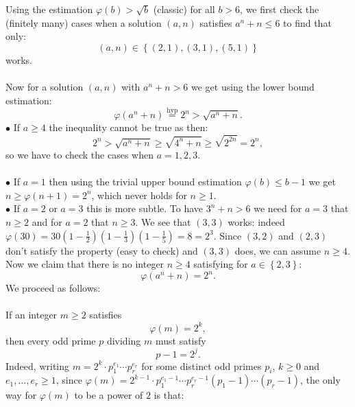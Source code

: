 \begin{solution}
    Using the estimation \( \varphi\left(b\right) > \sqrt{b} \) (classic) for all \( b > 6 \), we first check the (finitely many) cases when a solution \( \left(a,n\right) \) satisfies \( a^n + n \le 6 \) to find that only:
    \[
        \left(a,n\right) \in \left\{ \left(2,1\right), \left(3,1\right), \left(5,1\right) \right\}
    \]
    works.
    \\\\
    Now for a solution \( \left(a,n\right) \) with \( a^n + n > 6 \) we get using the lower bound estimation:
    \[
        \varphi \left( a^n + n \right) \overset{\text{hyp}}{=} 2^n > \sqrt{a^n + n}.
    \]
    \( \bullet \) If \( a \ge 4 \) the inequality cannot be true as then:
    \[
        2^n > \sqrt{a^n + n} \geq \sqrt{4^n + n} \geq \sqrt{2^{2n}} = 2^n,
    \]
    so we have to check the cases when \( a = 1, 2, 3 \).
    \\\\
    \( \bullet \) If \( a = 1 \) then using the trivial upper bound estimation \( \varphi\left(b\right) \leq b - 1 \) we get \( n \geq \varphi\left(n + 1\right) = 2^n \), which never holds for \( n \geq 1 \). \\
    \( \bullet \) If \( a = 2 \) or \( a = 3 \) this is more subtle. To have \( 3^n + n > 6 \) we need for \( a = 3 \) that \( n \geq 2 \) and for \( a = 2 \) that \( n \geq 3 \). We see that \( \left(3,3\right) \) works: indeed \( \varphi\left(30\right) = 30 \left(1 - \frac{1}{2}\right) \left(1 - \frac{1}{3}\right) \left(1 - \frac{1}{5}\right) = 8 = 2^3 \). Since \( \left(3,2\right) \) and \( \left(2,3\right) \) don't satisfy the property (easy to check) and \( \left(3,3\right) \) does, we can assume \( n \geq 4 \). Now we claim that there is no integer \( n \geq 4 \) satisfying for \( a \in \left\{2,3\right\} \):
    \[
        \varphi \left( a^n + n \right) = 2^n.
    \]
    We proceed as follows:
    \\\\
    If an integer \( m \geq 2 \) satisfies
    \[
        \varphi\left(m\right) = 2^k,
    \]
    then every odd prime \( p \) dividing \( m \) must satisfy
    \[
        p - 1 = 2^j.
    \]
    Indeed, writing \( m = 2^k \cdot p_1^{e_1} \cdots p_r^{e_r} \) for some distinct odd primes \( p_i \), \( k \geq 0 \) and \( e_1, \ldots, e_r \geq 1 \), since \( \varphi\left(m\right) = 2^{k-1} \cdot p_1^{e_1 - 1} \cdots p_r^{e_r - 1} \left(p_1 - 1\right) \cdots \left(p_r - 1\right) \), the only way for \( \varphi\left(m\right) \) to be a power of \( 2 \) is that:

\end{solution}

